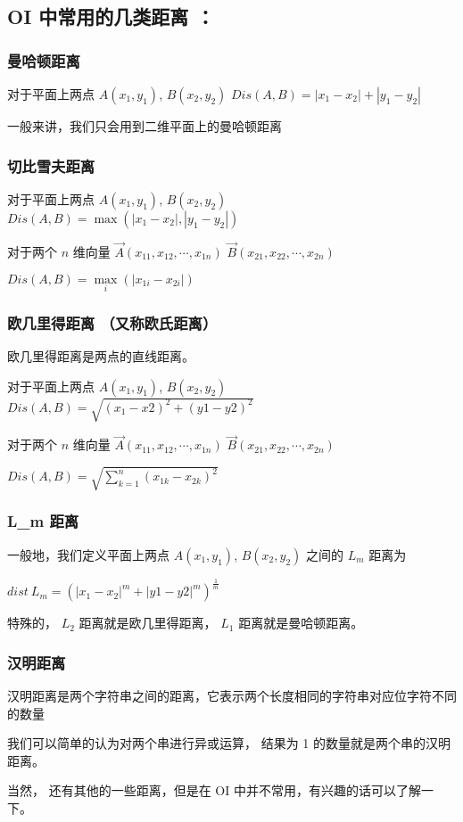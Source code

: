 
\subsection{OI 中常用的几类距离 ：}

\subsubsection{曼哈顿距离}

对于平面上两点 $A(x_1, y_1)$, $B(x_2, y_2)$ $Dis(A, B) = |x_1-x_2| + |y_1-y_2|$

一般来讲，我们只会用到二维平面上的曼哈顿距离

\subsubsection{切比雪夫距离}

对于平面上两点 $A(x_1, y_1)$, $B(x_2, y_2)$ $Dis(A, B) = \max(|x_1-x_2| , |y_1-y_2|)$

对于两个 $n$ 维向量 $\vec A(x_{11}, x_{12}, \cdots,x_{1n})$  $\vec B(x_{21}, x_{22}, \cdots,x_{2n})$

$Dis(A, B) = \max\limits_i(|x_{1i}-x_{2i}|)$

\subsubsection{欧几里得距离 （又称欧氏距离）}

欧几里得距离是两点的直线距离。

对于平面上两点 $A(x_1, y_1)$, $B(x_2, y_2)$ $Dis(A, B) = \sqrt{(x_1-x2)^2+(y1-y2)^2}$

对于两个 $n$ 维向量 $\vec A(x_{11}, x_{12}, \cdots,x_{1n})$  $\vec B(x_{21}, x_{22}, \cdots,x_{2n})$

$Dis(A, B) = \sqrt{\sum\limits_{k=1}^n(x_{1k}-x_{2k})^2}$

\subsubsection{L\_m 距离}

一般地，我们定义平面上两点 $A(x_1, y_1)$, $B(x_2, y_2)$ 之间的 $L_m$ 距离为

$dist~L_m = (|x_1-x_2|^m+|y1-y2|^m)^{\frac{1}{m}}$

特殊的， $L_2$ 距离就是欧几里得距离， $L_1$ 距离就是曼哈顿距离。

\subsubsection{汉明距离}

汉明距离是两个字符串之间的距离，它表示两个长度相同的字符串对应位字符不同的数量

我们可以简单的认为对两个串进行异或运算， 结果为 1 的数量就是两个串的汉明距离。

\hr

当然， 还有其他的一些距离，但是在 OI 中并不常用，有兴趣的话可以了解一下。
